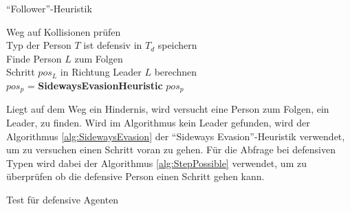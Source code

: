 \begin{algorithm} [H]
	\caption{"`Follower"'-Heuristik}
	\label{alg:Follower}
	
	\FollowerHeuristic{} {
		Weg auf Kollisionen prüfen \\
		Typ der Person $T$ ist defensiv in $T_d$ speichern \\
		 {
			Finde Person $L$ zum Folgen \\
			 { 
				Schritt $pos_L$ in Richtung Leader $L$ berechnen \\
				 {
					$pos_p$ = \textbf{SidewaysEvasionHeuristic}
				} 
			} 
		} 
		\Return $pos_p$
	}
\end{algorithm}

Liegt auf dem Weg ein Hindernis, wird versucht eine Person zum Folgen, ein Leader, zu finden. Wird im Algorithmus kein Leader gefunden, wird der Algorithmus \ref{alg:SidewaysEvasion} der "`Sideways Evasion"'-Heuristik verwendet, um zu versuchen einen Schritt voran zu gehen. Für die Abfrage bei defensiven Typen wird dabei der Algorithmus \ref{alg:StepPossible} verwendet, um zu überprüfen ob die defensive Person einen Schritt gehen kann. 

\begin{algorithm} [H]
	\caption{Test für defensive Agenten}
	\label{alg:StepPossible}
	
	 {
		 {
		\Return \False
		}\Else {
		\Return \True
		}
	}
\end{algorithm} 


